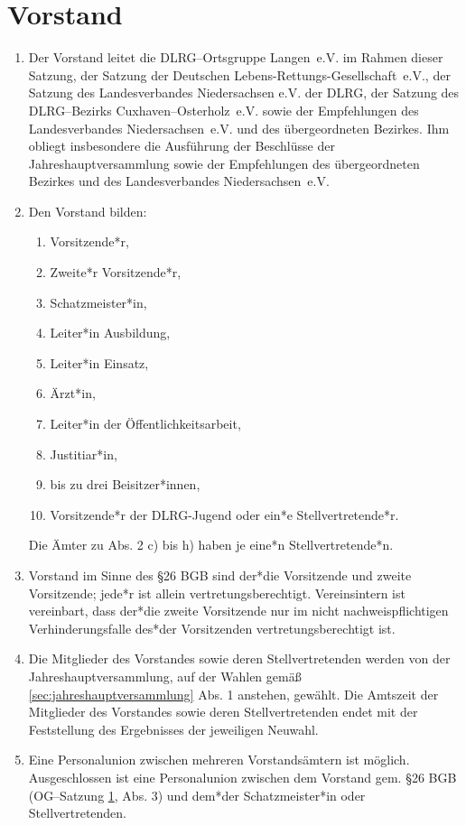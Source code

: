 \documentclass[%
12pt, %
a4paper, %
headsepline, %
parskip, %
headings=normal, %
]{scrreprt}
\begin{document}
\section{Vorstand}
\label{sec:vorstand}
\begin{enumerate}
    \item Der Vorstand leitet die DLRG--Ortsgruppe Langen~e.V. im Rahmen dieser Satzung, der Satzung der Deutschen Lebens-Rettungs-Gesellschaft~e.V., der Satzung des Landesverbandes Niedersachsen e.V. der DLRG, der Satzung des DLRG--Bezirks Cuxhaven--Osterholz~e.V. sowie der Empfehlungen des Landesverbandes Niedersachsen~e.V. und des übergeordneten Bezirkes. Ihm obliegt insbesondere die Ausführung der Beschlüsse der Jahreshauptversammlung sowie der Empfehlungen des übergeordneten Bezirkes und des Landesverbandes Niedersachsen~e.V.
    \item Den Vorstand bilden:\begin{enumerate}[noitemsep]
        \item Vorsitzende*r,
        \item Zweite*r Vorsitzende*r,
        \item Schatzmeister*in,
        \item Leiter*in Ausbildung,
        \item Leiter*in Einsatz,
        \item Ärzt*in,
        \item Leiter*in der Öffentlichkeitsarbeit,
        \item Justitiar*in,
        \item bis zu drei Beisitzer*innen,
        \item Vorsitzende*r der DLRG-Jugend oder ein*e Stellvertretende*r.
    \end{enumerate}
    Die Ämter zu Abs. 2 c) bis h) haben je eine*n Stellvertretende*n.
    \item Vorstand im Sinne des \S 26 BGB sind der*die Vorsitzende und zweite Vorsitzende; jede*r ist allein vertretungsberechtigt. Vereinsintern ist vereinbart, dass der*die zweite Vorsitzende nur im nicht nachweispflichtigen Verhinderungsfalle des*der Vorsitzenden vertretungsberechtigt ist.
    \item Die Mitglieder des Vorstandes sowie deren Stellvertretenden werden von der Jahreshauptversammlung, auf der Wahlen gemäß \ref{sec:jahreshauptversammlung} Abs. 1 anstehen, gewählt. Die Amtszeit der Mitglieder des Vorstandes sowie deren Stellvertretenden endet mit der Feststellung des Ergebnisses der jeweiligen Neuwahl.
    \item Eine Personalunion zwischen mehreren Vorstandsämtern ist möglich. Ausgeschlossen ist eine Personalunion zwischen dem Vorstand gem. \S 26 BGB (OG--Satzung \ref{sec:vorstand}, Abs. 3) und dem*der Schatzmeister*in oder Stellvertretenden.

\end{enumerate}
\end{document}
